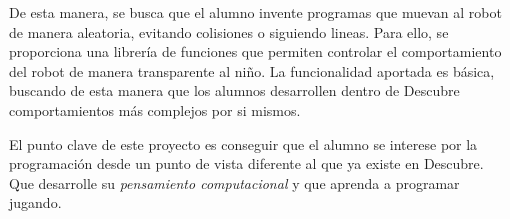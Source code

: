 De esta manera, se busca que el alumno invente programas que muevan al robot de manera aleatoria, evitando colisiones o siguiendo lineas. Para ello, se proporciona una librería de funciones que permiten controlar el comportamiento del robot de manera transparente al niño. La funcionalidad aportada es básica, buscando de esta manera que los alumnos desarrollen dentro de Descubre comportamientos más complejos por si mismos.

El punto clave de este proyecto es conseguir que el alumno se interese por la programación desde un punto de vista diferente al que ya existe en Descubre. Que desarrolle su \emph{pensamiento computacional} y que aprenda a programar jugando.


